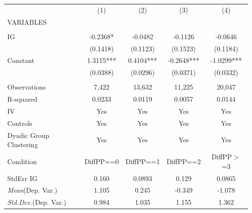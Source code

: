 \documentclass[]{article}
\begin{document}
\begin{tabular}{lcccc} \hline
 & (1) & (2) & (3) & (4) \\
VARIABLES &  &  &  &  \\ \hline
 &  &  &  &  \\
IG & -0.2368* & -0.0482 & -0.1126 & -0.0646 \\
 & (0.1418) & (0.1123) & (0.1523) & (0.1184) \\
Constant & 1.3115*** & 0.4104*** & -0.2648*** & -1.0299*** \\
 & (0.0388) & (0.0296) & (0.0371) & (0.0332) \\
 &  &  &  &  \\
Observations & 7,422 & 13,632 & 11,225 & 20,047 \\
R-squared & 0.0233 & 0.0119 & 0.0057 & 0.0144 \\
IV & Yes & Yes & Yes & Yes \\
Controls & Yes & Yes & Yes & Yes \\
Dyadic Group Clustering & Yes & Yes & Yes & Yes \\
Condition & DiffPP==0 & DiffPP==1 & DiffPP==2 & DiffPP$>$=3 \\
StdErr IG & 0.160 & 0.0893 & 0.129 & 0.0865 \\
\textit{Mean}(Dep. Var.) & 1.105 & 0.245 & -0.349 & -1.078 \\
 \textit{Std.Dev.}(Dep. Var.) & 0.984 & 1.035 & 1.155 & 1.362 \\ \hline
\end{tabular}
\end{document}
